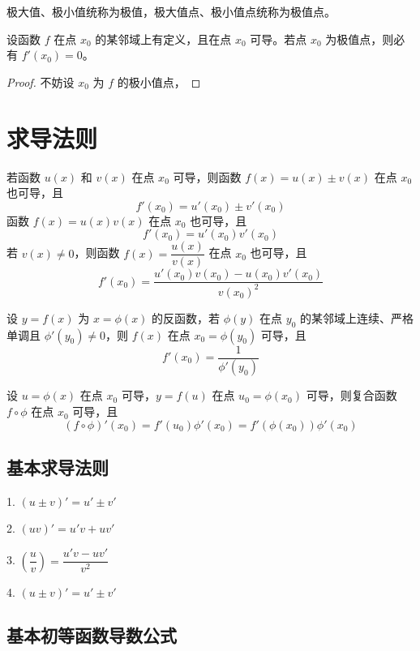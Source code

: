 极大值、极小值统称为极值，极大值点、极小值点统称为极值点。

\begin{theorem}[Fermat 定理]
	设函数 $f$ 在点 $x_0$ 的某邻域上有定义，且在点 $x_0$ 可导。若点 $x_0$ 为极值点，则必有 $f'(x_0)=0$。
\end{theorem}

\begin{proof}
	不妨设 $x_0$ 为 $f$ 的极小值点，
\end{proof}

\section{求导法则}

\begin{theorem}
	若函数 $u(x)$ 和 $v(x)$ 在点 $x_0$ 可导，则函数 $f(x)=u(x)\pm v(x)$ 在点 $x_0$ 也可导，且
	\[ f'(x_0) = u'(x_0)\pm v'(x_0) \]
	函数 $f(x)=u(x)v(x)$ 在点 $x_0$ 也可导，且
	\[ f'(x_0) = u'(x_0)v'(x_0) \]
	若 $v(x)\ne 0$，则函数 $f(x)=\dfrac{u(x)}{v(x)}$ 在点 $x_0$ 也可导，且
	\[ f'(x_0) = \frac{u'(x_0)v(x_0)-u(x_0)v'(x_0)}{v(x_0)^2} \]
\end{theorem}

\begin{theorem}
	设 $y=f(x)$ 为 $x=\phi(x)$ 的反函数，若 $\phi(y)$ 在点 $y_0$ 的某邻域上连续、严格单调且 $\phi'(y_0)\ne0$，则 $f(x)$ 在点 $x_0=\phi(y_0)$ 可导，且
	\[ f'(x_0)=\frac{1}{\phi'(y_0)} \]
\end{theorem}

\begin{theorem}
	设 $u=\phi(x)$ 在点 $x_0$ 可导，$y=f(u)$ 在点 $u_0=\phi(x_0)$ 可导，则复合函数 $f\circ \phi$ 在点 $x_0$ 可导，且
	\[ (f\circ \phi)'(x_0) = f'(u_0)\phi'(x_0) = f'(\phi(x_0))\phi'(x_0) \]
\end{theorem}

\subsection{基本求导法则}

1. $(u\pm v)' = u'\pm v'$

2. $(uv)' = u'v+uv'$

3. $\left(\dfrac{u}{v}\right) = \dfrac{u'v-uv'}{v^2}$

4. $(u\pm v)' = u'\pm v'$

\subsection{基本初等函数导数公式}

